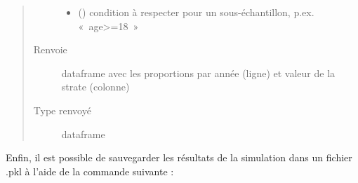 \documentclass[letterpaper,10pt,french]{sphinxmanual}
\begin{document}
\begin{fulllineitems}
\begin{fulllineitems}
\begin{quote}
\begin{description}
\begin{itemize}
\item {} 
 () \textendash{} condition à respecter pour un sous-échantillon, p.ex. « age\textgreater{}=18 »

\end{itemize}

\item[{Renvoie}] \leavevmode
dataframe avec les proportions par année (ligne) et valeur de la strate (colonne)

\item[{Type renvoyé}] \leavevmode
dataframe

\end{description}\end{quote}

\end{fulllineitems}


\end{fulllineitems}


\begin{DUlineblock}{0em}
\item[] 
\end{DUlineblock}


Enfin, il est possible de sauvegarder les résultats de la simulation dans un fichier .pkl à l’aide de la commande suivante :

\begin{sphinxVerbatim}[commandchars=\\\{\}]
\end{sphinxVerbatim}

\end{document}
